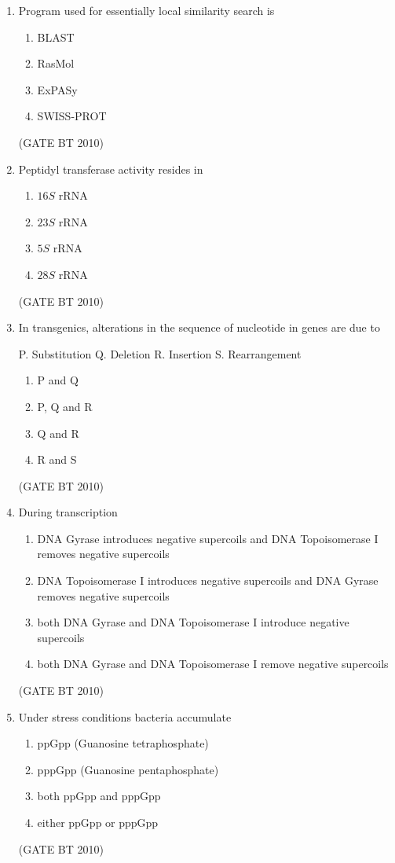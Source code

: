 \documentclass[journal,12pt,onecolumn]{IEEEtran}
\theoremstyle{remark}
\begin{document}
\begin{enumerate}
\item Program used for essentially local similarity search is  
\begin{enumerate}
    \item BLAST  
    \item RasMol  
    \item ExPASy  
    \item SWISS-PROT  
\end{enumerate}
\hfill (GATE BT 2010)

\item Peptidyl transferase activity resides in  
\begin{enumerate}
    \item $16S$ rRNA  
    \item $23S$ rRNA  
    \item $5S$ rRNA  
    \item $28S$ rRNA  
\end{enumerate}
\hfill (GATE BT 2010)

\item In transgenics, alterations in the sequence of nucleotide in genes are due to  

P. Substitution  
Q. Deletion  
R. Insertion  
S. Rearrangement  

\begin{enumerate}
    \item P and Q  
    \item P, Q and R  
    \item Q and R  
    \item R and S  
\end{enumerate}
\hfill (GATE BT 2010)

\item During transcription  
\begin{enumerate}
    \item DNA Gyrase introduces negative supercoils and DNA Topoisomerase I removes negative supercoils  
    \item DNA Topoisomerase I introduces negative supercoils and DNA Gyrase removes negative supercoils  
    \item both DNA Gyrase and DNA Topoisomerase I introduce negative supercoils  
    \item both DNA Gyrase and DNA Topoisomerase I remove negative supercoils  
\end{enumerate}
\hfill (GATE BT 2010)

\item 
Under stress conditions bacteria accumulate  
\begin{enumerate}
    \item ppGpp (Guanosine tetraphosphate)  
    \item pppGpp (Guanosine pentaphosphate)  
    \item both ppGpp and pppGpp  
    \item either ppGpp or pppGpp  
\end{enumerate}
\hfill (GATE BT 2010)


\end{enumerate}
\end{document}
